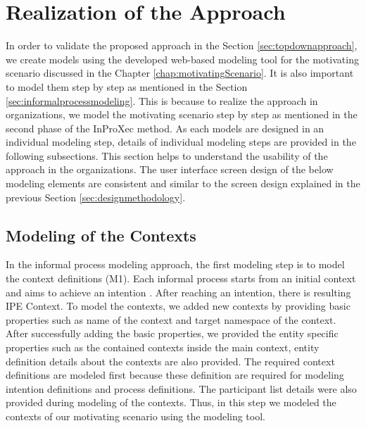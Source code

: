 \section{Realization of the Approach}
\label{sec:realization}
In order to validate the proposed approach in the Section \ref{sec:topdownapproach}, we create models using the developed web-based modeling tool for the motivating scenario discussed in the Chapter \ref{chap:motivatingScenario}. It is also important to model them step by step as mentioned in the Section \ref{sec:informalprocessmodeling}. This is because to realize the approach in organizations, we model the motivating scenario step by step as mentioned in the second phase of the InProXec method. As each models are designed in an individual modeling step, details of individual modeling steps are provided in the following subsections. This section helps to understand the usability of the approach in the organizations. The user interface screen design of the below modeling elements are consistent and similar to the screen design explained in the previous Section \ref{sec:designmethodology}.

\subsection{Modeling of the Contexts}
In the informal process modeling approach, the first modeling step is to model the context definitions (M1). Each informal process starts from an initial context and aims to achieve an intention \cite{Sungur2014a}. After reaching an intention, there is resulting IPE Context. To model the contexts, we added new contexts by providing basic properties such as name of the context and target namespace of the context. After successfully adding the basic properties, we provided the entity specific properties such as the contained contexts inside the main context, entity definition details about the contexts are also provided. The required context definitions are modeled first because these definition are required for modeling intention definitions and process definitions. The participant list details were also provided during modeling of the contexts. Thus, in this step we modeled the contexts of our motivating scenario using the modeling tool. 

